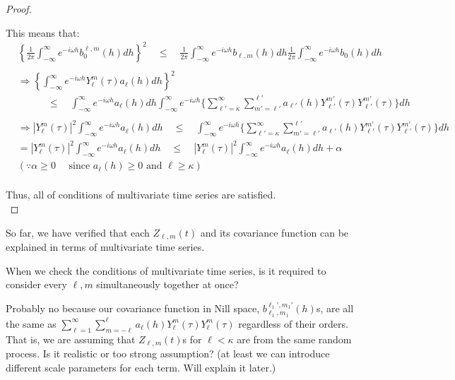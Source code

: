 \documentclass[11pt]{article}
\begin{document}
\begin{itemize}
\begin{proof}
\begin{enumerate}
This means that:
\begin{align*}
&\left\{ \frac{1}{2\pi} \int_{-\infty}^\infty e^{-i\omega h} b_{0}^{\ell,m}(h) dh \right\}^2 \quad \le \quad \frac{1}{2\pi} \int_{-\infty}^\infty e^{-i\omega h} b_{\ell,m}(h) dh \frac{1}{2\pi} \int_{-\infty}^\infty e^{-i\omega h} b_{0}(h) dh \\
\\
&\Rightarrow \left\{ \int_{-\infty}^\infty e^{-i\omega h} Y_{\ell}^{m}(\tau) a_{\ell}(h) dh \right\}^2\\ 
&\quad \quad \quad \le \quad \int_{-\infty}^\infty e^{-i\omega h} a_{\ell}(h) dh \int_{-\infty}^\infty e^{-i\omega h} \biggl\{ \sum_{{\ell}'=\kappa}^{\infty} \sum_{m'=\ell'}^{\ell'} a_{{\ell}'}(h) Y_{{\ell}'}^{{m}'}(\tau) Y_{{\ell}'}^{{m}'}(\tau) \biggl\} dh\\
\\
&\Rightarrow |Y_{\ell}^{m}(\tau)|^2 \int_{-\infty}^\infty e^{-i\omega h} a_{\ell}(h) dh \quad \le \quad \int_{-\infty}^\infty e^{-i\omega h} \biggl\{ \sum_{{\ell}'=\kappa}^{\infty} \sum_{m'=\ell'}^{\ell'} a_{{\ell}'}(h) Y_{{\ell}'}^{{m}'}(\tau) Y_{{\ell}'}^{{m}'}(\tau) \biggl\} dh\\
&= |Y_{\ell}^{m}(\tau)|^2 \int_{-\infty}^\infty e^{-i\omega h} a_{\ell}(h) dh \quad \le \quad |Y_{\ell}^{m}(\tau)|^2 \int_{-\infty}^\infty e^{-i\omega h} a_{\ell}(h) dh + \alpha\\
&(\because \alpha \ge 0 \quad \text{ since } a_\ell(h) \ge 0 \text{ and } \ell \ge \kappa)\\
\end{align*}

\end{enumerate}

Thus, all of conditions of multivariate time series are satisfied.\\

\end{proof}

\pagebreak
\item
So far, we have verified that each $Z_{\ell,m}(t)$ and its covariance function can be explained in terms of multivariate time series.\\

\item
{\color{red}
When we check the conditions of multivariate time series, is it required to consider every $\ell, m$ simultaneously together at once?\\ 

\item 
Probably no because our covariance function in Nill space, $b_{\ell_1,m_1}^{\ell_1',m_1'}(h)$s, are all the same as $\sum_{\ell=1}^{\infty} \sum_{m=-\ell}^{\ell} a_{\ell}(h) Y_{\ell}^{m}(\tau) Y_{\ell}^{m}(\tau)$ regardless of their orders. That is, we are assuming that $Z_{\ell,m}(t)$s for $\ell<\kappa$ are from the same random process. Is it realistic or too strong assumption? (at least we can introduce different scale parameters for each term. Will explain it later.) 

}
\end{itemize}
\end{document}
